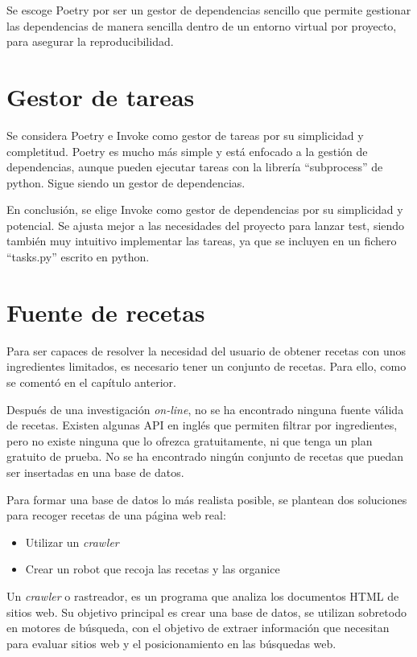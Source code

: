 Se escoge Poetry por ser un gestor de dependencias sencillo que permite gestionar las dependencias de manera sencilla dentro de un entorno virtual por proyecto, para asegurar la reproducibilidad.

\section{Gestor de tareas}
Se considera Poetry e Invoke como gestor de tareas por su simplicidad y completitud. Poetry es mucho más simple y está enfocado a la gestión de dependencias, aunque pueden ejecutar tareas con la librería ``subprocess'' de \Gls{python}. Sigue siendo un gestor de dependencias. 

En conclusión, se elige Invoke como gestor de dependencias por su simplicidad y potencial. Se ajusta mejor a las necesidades del proyecto para lanzar test, siendo también muy intuitivo implementar las tareas, ya que se incluyen en un fichero ``tasks.py'' escrito en \Gls{python}.

\section{Fuente de recetas}
Para ser capaces de resolver la necesidad del usuario de obtener recetas con unos ingredientes limitados, es necesario tener un conjunto de recetas. Para ello, como se comentó en el capítulo anterior. 

Después de una investigación \textit{on-line}, no se ha encontrado ninguna fuente válida de recetas. Existen algunas API en inglés que permiten filtrar por ingredientes, pero no existe ninguna que lo ofrezca gratuitamente, ni que tenga un plan gratuito de prueba. No se ha encontrado ningún conjunto de recetas que puedan ser insertadas en una base de datos. 

Para formar una base de datos lo más realista posible, se plantean dos soluciones para recoger recetas de una página web real: 
\begin{itemize}
    \item Utilizar un \textit{\gls{crawler}}
    \item Crear un robot que recoja las recetas y las organice 
\end{itemize}

Un \textit{crawler} o rastreador, es un programa que analiza los documentos \gls{HTML} de sitios web. Su objetivo principal es crear una base de datos, se utilizan sobretodo en motores de búsqueda, con el objetivo de extraer información que necesitan para evaluar sitios web y el posicionamiento en las búsquedas web.\cite{https://es.ryte.com/wiki/Crawler}


